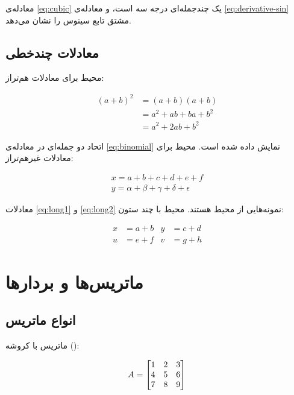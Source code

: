 \documentclass{matinbook}
\begin{document}
معادله‌ی \cref{eq:cubic} یک چندجمله‌ای درجه سه است، و
معادله‌ی \cref{eq:derivative-sin} مشتق تابع سینوس را
نشان می‌دهد.

\section{معادلات چندخطی}
\label{sec:equations-multiline}

محیط  برای معادلات هم‌تراز:

\begin{align}
    (a + b)^{2} &= (a + b)(a + b) \nonumber \\
    &= a^{2} + ab + ba + b^{2} \nonumber \\
    &= a^{2} + 2ab + b^{2} \label{eq:binomial}
\end{align}

اتحاد دو جمله‌ای در معادله‌ی \cref{eq:binomial} نمایش داده
شده است. محیط  برای معادلات غیرهم‌تراز:

\begin{gather}
    x = a + b + c + d + e + f \label{eq:long1} \\
    y = \alpha + \beta + \gamma + \delta + \epsilon \label{eq:long2}
\end{gather}

معادلات \cref{eq:long1} و \cref{eq:long2} نمونه‌هایی از
محیط  هستند. محیط  با چند ستون:

\begin{align}
    x &= a + b & y &= c + d \label{eq:multi1} \\
    u &= e + f & v &= g + h \label{eq:multi2}
\end{align}

\chapter{ماتریس‌ها و بردارها}
\label{chap:matrices}

\section{انواع ماتریس}
\label{sec:matrices-types}

ماتریس با کروشه ():

\[
A = \begin{bmatrix}1 & 2 & 3 \\ 4 & 5 & 6 \\ 7 & 8 & 9\end{bmatrix}
\]
\end{document}
